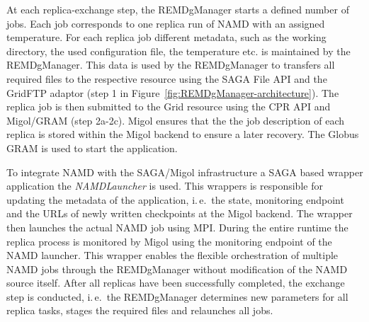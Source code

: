 \documentclass[times, 10pt, twocolumn]{article}
\begin{document}
At each replica-exchange step, the REMDgManager starts a defined
number of jobs. Each job corresponds to one replica run of NAMD 
with an assigned temperature. 
For each replica job different metadata, such as the
working directory, the used configuration file, the temperature
etc. is maintained by the REMDgManager.  This data is used by the REMDgManager to
transfers all required files to the respective resource using the SAGA
File API and the GridFTP adaptor (step 1 in Figure~\ref{fig:REMDgManager-architecture}). 
The replica job is then submitted to the Grid resource using  
the CPR API and Migol/GRAM (step 2a-2c). Migol ensures that the 
the job description of each replica is stored within the Migol backend to
ensure a later recovery.  The Globus GRAM is used to start the application.

To integrate NAMD with the SAGA/Migol infrastructure a SAGA based
wrapper application the \emph{NAMDLauncher} is used.  This wrappers is responsible for
updating the metadata of the application, i.\,e.\ the state,
monitoring endpoint and the URLs of newly written checkpoints at the
Migol backend.  The wrapper then launches the actual NAMD job using
MPI. During the entire runtime the replica process is monitored by 
Migol using the monitoring endpoint of the NAMD
launcher. This wrapper enables the flexible orchestration of multiple
NAMD jobs through the REMDgManager without modification of the NAMD
source itself. After all replicas have been successfully completed,
the exchange step is conducted, i.\,e.\ the REMDgManager determines
new parameters for all replica tasks, stages the required files and
relaunches all jobs.

                                             
\end{document}
